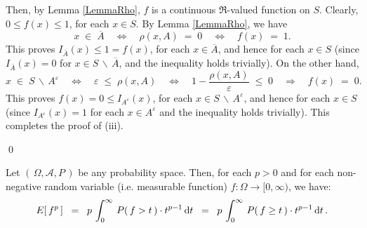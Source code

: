\begin{enumerate}
	Then, by Lemma \ref{LemmaRho}, $f$ is a continuous $\Re$-valued function on $S$.
	Clearly, $0 \leq f(x) \leq 1$, for each $x \in S$.
	By Lemma \ref{LemmaRho}, we have
	\begin{equation*}
	x \;\in\; \overline{A}
	\quad\Longleftrightarrow\quad
	\rho(x,A) \;=\; 0
	\quad\Longleftrightarrow\quad
	f(x) \; = \; 1.
	\end{equation*}
	This proves $I_{\bar{A}}(x) \leq 1 = f(x)$, for each $x \in \overline{A}$, and hence for each $x \in S$
	(since $I_{\bar{A}}(x) = 0$ for $x \in S\,\backslash\,\overline{A}$, and the inequality holds trivially).
	On the other hand,
	\begin{equation*}
	x \;\in\; S\,\backslash\,A^{\varepsilon}
	\quad\Longleftrightarrow\quad
	\varepsilon \;\leq\; \rho(x,A)
	\quad\Longleftrightarrow\quad
	1 - \dfrac{\rho(x,A)}{\varepsilon} \;\leq\; 0
	\quad\Longrightarrow\quad
	f(x) \;=\; 0.
	\end{equation*}
	This proves $f(x) = 0 \leq I_{A^{\varepsilon}}(x)$, for each $x \in S\,\backslash\,A^{\varepsilon}$,
	and hence for each $x \in S$ (since $I_{A^{\varepsilon}}(x) = 1$ for each $x \in A^{\varepsilon}$
	and the inequality holds trivially).
	This completes the proof of (iii).
\end{enumerate}
\qed

\begin{lemma}
\label{LemmaMomentsAndTails}
\mbox{}
\vskip 0.1cm
\noindent
Let $\left(\,\Omega,\mathcal{A},P\,\right)$ be any probability space.
Then, for each $p > 0$ and
for each non-negative random variable (i.e. measurable function) $f : \Omega \longrightarrow [0,\infty)$,
we have:
\begin{equation*}
E\!\left[\,f^{p}\,\right]
\;\; = \;\; p\,\int_{0}^{\infty}\,P\!\left(\,f > t\,\right)\cdot t^{p-1}\,\textnormal{d} t
\;\; = \;\; p\,\int_{0}^{\infty}\,P\!\left(\,f \geq t\,\right)\cdot t^{p-1}\,\textnormal{d} t\,.
\end{equation*}
\end{lemma}

